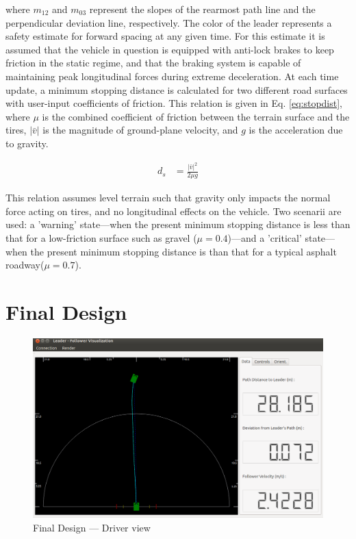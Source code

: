 \documentclass[12pt]{report}
\begin{document}
where $m_{12}$ and $m_{03}$ represent the slopes of the rearmost path line and the perpendicular deviation line, respectively.
The color of the leader represents a safety estimate for forward spacing at any given time. For this estimate it is assumed that the vehicle in question is equipped with anti-lock brakes to keep friction in the static regime, and that the braking system is capable of maintaining peak longitudinal forces during extreme deceleration. At each time update, a minimum stopping distance is calculated for two different road surfaces with user-input coefficients of friction. This relation is given in Eq. \ref{eq:stopdist}, where $\mu$  is the combined coefficient of friction between the terrain surface and the tires,  $|\bar{v}|$ is the magnitude of ground-plane velocity, and $g$ is the acceleration due to gravity.

\begin{align} \label{eq:stopdist}
    d_s &= \frac {|\bar{v}|^2} {2 \mu g}
\end{align}

This relation assumes level terrain such that gravity only impacts the normal force acting on tires, and no longitudinal effects on the vehicle. Two scenarii are used: a 'warning' state---when the present minimum stopping distance is less than that for a low-friction surface such as gravel ($\mu=0.4$)---and a 'critical' state---when the present minimum stopping distance is than that for a typical asphalt roadway($\mu=0.7$). 


\section{Final Design}
\label{sec:finaldes}

\begin{figure}[ht] \centering
    \includegraphics[width=6.5in]{./figs/final_design_data.png}
    \caption{Final Design --- Driver view}
    \label{fig:finaldesdriv_monolith}
\end{figure}
\end{document}

